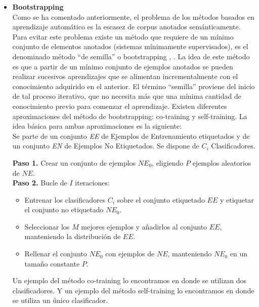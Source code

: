 \begin{itemize}
  \item \textbf{Bootstrapping} \\
  Como se ha comentado anteriormente, el problema de los métodos basados en aprendizaje automático es la escasez de corpus anotados semánticamente. Para evitar este problema existe un método que requiere de un mínimo conjunto de elementos anotados (sistemas mínimamente supervisados), es el denominado método “de semilla” o bootstrapping \cite{035}, \cite{036}. La idea de este método es que a partir de un mínimo conjunto de ejemplos anotados se pueden realizar sucesivos aprendizajes que se alimentan incrementalmente con el conocimiento adquirido en el anterior. El término “semilla” proviene del inicio de tal proceso iterativo, que no necesita más que una mínima cantidad de conocimiento previo para comenzar el aprendizaje. Existen diferentes aproximaciones del método de bootstrapping: co-training y self-training. La idea básica para ambas aproximaciones es la siguiente:\\
  Se parte de un conjunto \textit{EE} de Ejemplos de Entrenamiento etiquetados y de un conjunto \textit{EN} de Ejemplos No Etiquetados. Se dispone de $C_i$ Clasificadores.

  \textbf{Paso 1.} Crear un conjunto de ejemplos $NE_0$, eligiendo $P$ ejemplos aleatorios de $NE$.\\
  \textbf{Paso 2.} Bucle de $I$ iteraciones:
  \begin{itemize}
    \item Entrenar los clasificadores $C_i$ sobre el conjunto etiquetado $EE$ y etiquetar el conjunto no etiquetado $NE_0$.
    \item Seleccionar los $M$ mejores ejemplos y añadirlos al conjunto $EE$, manteniendo la distribución de $EE$.
    \item Rellenar el conjunto $NE_0$ con ejemplos de $NE$, manteniendo $NE_0$ en un tamaño constante $P$.
  \end{itemize}

  Un ejemplo del método co-training lo encontramos en \cite{037} donde se utilizan dos clasificadores. Y un ejemplo del método self-training lo encontramos en \cite{038} donde se utiliza un único clasificador.


\end{itemize}
